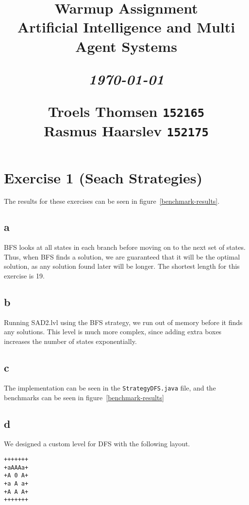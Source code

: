 \documentclass[12pt]{article}
\title{
  \vspace{4cm}
  \begin{flushleft}
  \Large{\textbf{Warmup Assignment}} \\
  \large{Artificial Intelligence and Multi Agent Systems}
  \end{flushleft}
  \vspace{0cm}
  \begin{flushleft}
  \small
  \textit{\today}
  \end{flushleft}
  \vspace{12cm}
  \begin{flushleft}
  \small
  Troels Thomsen \texttt{152165} \\
  Rasmus Haarslev \texttt{152175} \\
  \end{flushleft}
}
\date{
}
\begin{document}
\clearpage
{}
\thispagestyle{empty}
\maketitle

\newpage

\section{Exercise 1 (Seach Strategies)}

The results for these exercises can be seen in figure~\ref{benchmark-results}.


\subsection{a}
\label{sub:a}

BFS looks at all states in each branch before moving on to the next set of states. Thus, when BFS finds a solution, we are guaranteed that it will be the optimal solution, as any solution found later will be longer. The shortest length for this exercise is 19.

\subsection{b}
\label{sub:b}

Running SAD2.lvl using the BFS strategy, we run out of memory before it finds any solutions.
This level is much more complex, since adding extra boxes increases the number of states exponentially.


\subsection{c}
\label{sub:c}

The implementation can be seen in the \texttt{StrategyDFS.java} file, and the benchmarks can be seen in figure~\ref{benchmark-results}


\subsection{d}
\label{sub:d}

We designed a custom level for DFS with the following layout.

\begin{verbatim}
+++++++
+aAAAa+
+A 0 A+
+a A a+
+A A A+
+++++++
\end{verbatim}
\end{document}
